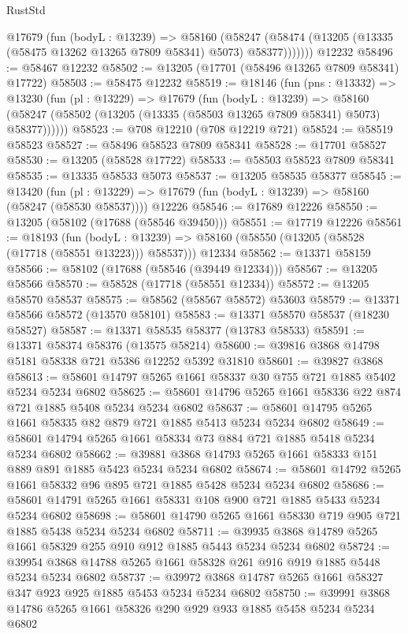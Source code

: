 \begin{lexlean}{RustStd}
\begin{coremodule}
        @17679
          (fun (bodyL : @13239) =>
          @58160
            (@58247 (@58474 (@13205 (@13335 (@58475 @13262 @13265 @7809 @58341) @5073) @58377)))))))
    @12232
@58496 := @58467 @12232
@58502 := @13205 (@17701 (@58496 @13265 @7809 @58341) @17722)
@58503 := @58475 @12232
@58519 := @18146
    (fun (pns : @13332) =>
    @13230
      (fun (pl : @13229) =>
      @17679
        (fun (bodyL : @13239) =>
        @58160 (@58247 (@58502 (@13205 (@13335 (@58503 @13265 @7809 @58341) @5073) @58377))))))
@58523 := @708 @12210 (@708 @12219 @721)
@58524 := @58519 @58523
@58527 := @58496 @58523 @7809 @58341
@58528 := @17701 @58527
@58530 := @13205 (@58528 @17722)
@58533 := @58503 @58523 @7809 @58341
@58535 := @13335 @58533 @5073
@58537 := @13205 @58535 @58377
@58545 := @13420
    (fun (pl : @13229) => @17679 (fun (bodyL : @13239) => @58160 (@58247 (@58530 @58537))))
    @12226
@58546 := @17689 @12226
@58550 := @13205 (@58102 (@17688 (@58546 @39450)))
@58551 := @17719 @12226
@58561 := @18193
    (fun (bodyL : @13239) => @58160 (@58550 (@13205 (@58528 (@17718 (@58551 @13223))) @58537)))
    @12334
@58562 := @13371 @58159
@58566 := @58102 (@17688 (@58546 (@39449 @12334)))
@58567 := @13205 @58566
@58570 := @58528 (@17718 (@58551 @12334))
@58572 := @13205 @58570 @58537
@58575 := @58562 (@58567 @58572) @53603
@58579 := @13371 @58566 @58572 (@13570 @58101)
@58583 := @13371 @58570 @58537 (@18230 @58527)
@58587 := @13371 @58535 @58377 (@13783 @58533)
@58591 := @13371 @58374 @58376 (@13575 @58214)
@58600 := @39816 @3868 @14798 @5181 @58338 @721 @5386 @12252 @5392 @31810
@58601 := @39827 @3868
@58613 := @58601 @14797 @5265 @1661 @58337 @30 @755 @721 @1885 @5402 @5234 @5234 @6802
@58625 := @58601 @14796 @5265 @1661 @58336 @22 @874 @721 @1885 @5408 @5234 @5234 @6802
@58637 := @58601 @14795 @5265 @1661 @58335 @82 @879 @721 @1885 @5413 @5234 @5234 @6802
@58649 := @58601 @14794 @5265 @1661 @58334 @73 @884 @721 @1885 @5418 @5234 @5234 @6802
@58662 := @39881 @3868 @14793 @5265 @1661 @58333 @151 @889 @891 @1885 @5423 @5234 @5234 @6802
@58674 := @58601 @14792 @5265 @1661 @58332 @96 @895 @721 @1885 @5428 @5234 @5234 @6802
@58686 := @58601 @14791 @5265 @1661 @58331 @108 @900 @721 @1885 @5433 @5234 @5234 @6802
@58698 := @58601 @14790 @5265 @1661 @58330 @719 @905 @721 @1885 @5438 @5234 @5234 @6802
@58711 := @39935 @3868 @14789 @5265 @1661 @58329 @255 @910 @912 @1885 @5443 @5234 @5234 @6802
@58724 := @39954 @3868 @14788 @5265 @1661 @58328 @261 @916 @919 @1885 @5448 @5234 @5234 @6802
@58737 := @39972 @3868 @14787 @5265 @1661 @58327 @347 @923 @925 @1885 @5453 @5234 @5234 @6802
@58750 := @39991 @3868 @14786 @5265 @1661 @58326 @290 @929 @933 @1885 @5458 @5234 @5234 @6802

\end{coremodule}
\end{lexlean}
